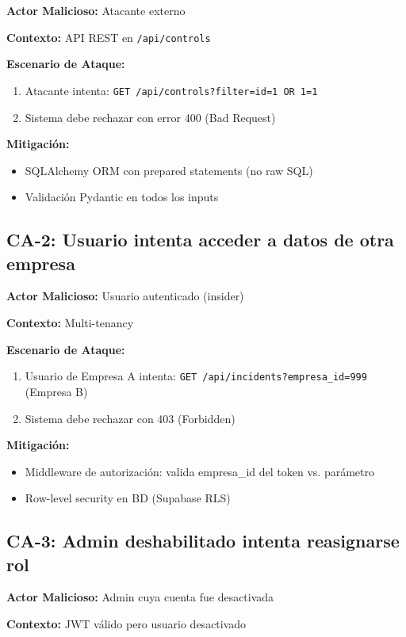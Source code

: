 \documentclass[12pt,a4paper,oneside]{article}
\begin{document}
\textbf{Actor Malicioso:} Atacante externo

\textbf{Contexto:} API REST en \texttt{/api/controls}

\textbf{Escenario de Ataque:}
\begin{enumerate}
  \item Atacante intenta: \texttt{GET /api/controls?filter=id=1 OR 1=1}
  \item Sistema debe rechazar con error 400 (Bad Request)
\end{enumerate}

\textbf{Mitigación:}
\begin{itemize}
  \item [OK] SQLAlchemy ORM con prepared statements (no raw SQL)
  \item [OK] Validación Pydantic en todos los inputs
\end{itemize}

\subsection{CA-2: Usuario intenta acceder a datos de otra empresa}

\textbf{Actor Malicioso:} Usuario autenticado (insider)

\textbf{Contexto:} Multi-tenancy

\textbf{Escenario de Ataque:}
\begin{enumerate}
  \item Usuario de Empresa A intenta: \texttt{GET /api/incidents?empresa\_id=999} (Empresa B)
  \item Sistema debe rechazar con 403 (Forbidden)
\end{enumerate}

\textbf{Mitigación:}
\begin{itemize}
  \item [OK] Middleware de autorización: valida empresa\_id del token vs. parámetro
  \item [OK] Row-level security en BD (Supabase RLS)
\end{itemize}

\subsection{CA-3: Admin deshabilitado intenta reasignarse rol}

\textbf{Actor Malicioso:} Admin cuya cuenta fue desactivada

\textbf{Contexto:} JWT válido pero usuario desactivado
\end{document}

